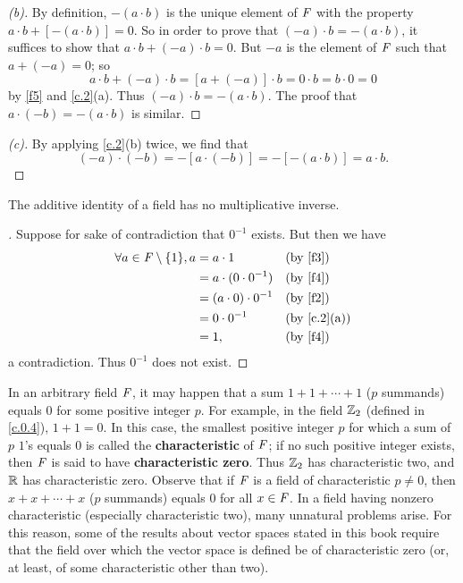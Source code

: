 \begin{proof}[(b)]
	By definition, \(-(a \cdot b)\) is the unique element of \(\mathit{F}\) with the property \(a \cdot b + [-(a \cdot b)] = 0\).
	So in order to prove that \((-a) \cdot b = -(a \cdot b)\), it suffices to show that \(a \cdot b + (-a) \cdot b = 0\).
	But \(-a\) is the element of \(\mathit{F}\) such that \(a + (-a) = 0\);
	so
	\[
		a \cdot b + (-a) \cdot b = [a + (-a)] \cdot b = 0 \cdot b = b  \cdot 0 = 0
	\]
	by \ref{f5} and \cref{c.2}(a).
	Thus \((-a) \cdot b = -(a \cdot b)\).
	The proof that \(a \cdot (-b) = -(a \cdot b)\) is similar.
\end{proof}

\begin{proof}[(c)]
	By applying \cref{c.2}(b) twice, we find that
	\[
		(-a) \cdot (-b) = -[a \cdot (-b)] = -[-(a \cdot b)] = a \cdot b.
	\]
\end{proof}

\begin{cor}\label{c.0.8}
	The additive identity of a field has no multiplicative inverse.
\end{cor}

\begin{proof}[]
	Suppose for sake of contradiction that \(0^{-1}\) exists.
	But then we have
	\begin{align*}
		\forall a \in \F \setminus \set{1}, a & = a \cdot 1                &  & \text{(by \ref{f3})} \\
		                                      & = a \cdot (0 \cdot 0^{-1}) &  & \text{(by \ref{f4})} \\
		                                      & = (a \cdot 0) \cdot 0^{-1} &  & \text{(by \ref{f2})} \\
		                                      & = 0 \cdot 0^{-1}           &  & \by{c.2}[a]          \\
		                                      & = 1,                       &  & \text{(by \ref{f4})}
	\end{align*}
	a contradiction.
	Thus \(0^{-1}\) does not exist.
\end{proof}

\begin{defn}\label{c.0.9}
	In an arbitrary field \(\mathit{F}\), it may happen that a sum \(1 + 1 + \cdots + 1\) (\(p\) summands) equals \(0\) for some positive integer \(p\).
	For example, in the field \(\mathbb{Z}_2\) (defined in \cref{c.0.4}), \(1 + 1 = 0\).
	In this case, the smallest positive integer \(p\) for which a sum of \(p\) \(1\)'s equals \(0\) is called the \textbf{characteristic} of \(\mathit{F}\);
	if no such positive integer exists, then \(\mathit{F}\) is said to have \textbf{characteristic zero}.
	Thus \(\mathbb{Z}_2\) has characteristic two, and \(\mathbb{R}\) has characteristic zero.
	Observe that if \(\mathit{F}\) is a field of characteristic \(p \neq 0\), then \(x + x + \cdots + x\) (\(p\) summands) equals \(0\) for all \(x \in \mathit{F}\).
	In a field having nonzero characteristic (especially characteristic two), many unnatural problems arise.
	For this reason, some of the results about vector spaces stated in this book require that the field over which the vector space is defined be of characteristic zero (or, at least, of some characteristic other than two).
\end{defn}
